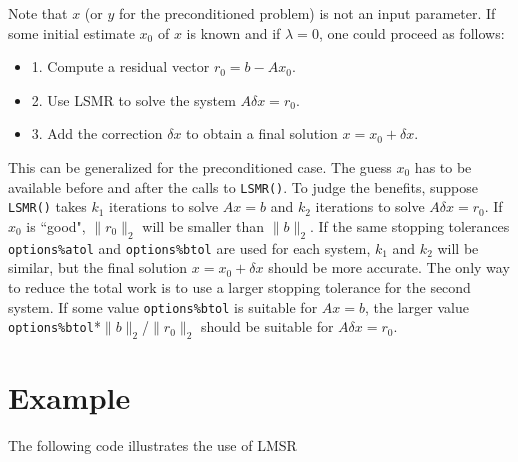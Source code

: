      Note that $x$ (or $y$ for the preconditioned problem) is not an input parameter.
     If some initial estimate $x_0$ of $x$ is known and if $\lambda = 0$,
     one could proceed as follows:
    \begin{itemize} 
     \item 1. Compute a residual vector     $r_0 = b - Ax_0$.
    \item 2. Use LSMR to solve the system  $A \delta x = r_0$.
    \item 3. Add the correction $\delta x$ to obtain a final solution $x = x_0 + \delta x$.
    \end{itemize}
     This can be generalized for the preconditioned case.
     The guess $x_0$ has to be available before and after the calls
     to {\tt LSMR()}.  To judge the benefits, suppose {\tt LSMR()} takes $k_1$ iterations
     to solve $Ax = b$ and $k_2$ iterations to solve $A \delta x = r_0$.
     If $x_0$ is ``good", $\|r_0\|_2$ will be smaller than $\|b\|_2$.
     If the same stopping tolerances {\tt options\%atol} and {\tt options\%btol}
      are used for each
     system, $k_1$ and $k_2$ will be similar, but the final solution $x = x_0 + \delta x$
     should be more accurate.  The only way to reduce the total work
     is to use a larger stopping tolerance for the second system.
     If some value {\tt options\%btol} is suitable for $Ax=b$, the larger value
     {\tt options\%btol}*$\|b\|_2$/$\|r_0\|_2$  should be suitable for $A \delta x = r_0$.
    




\section{Example}
The following code illustrates the use of LMSR

